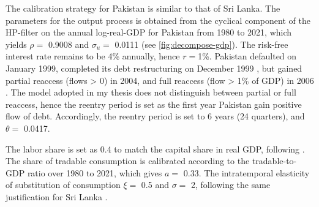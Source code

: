 The calibration strategy for Pakistan is similar to that of Sri Lanka.
The parameters for the output process is obtained from the cyclical component of the HP-filter on the annual log-real-GDP for Pakistan from 1980 to 2021, which yields $\rho = $ 0.9008 and $\sigma_u=$ 0.0111 (see \autoref{fig:decompose-gdp}).
The risk-free interest rate remains to be 4\% annually, hence $r= $1\%.
Pakistan defaulted on January 1999, completed its debt restructuring on December 1999 \citep{SPGlobal-default-report}, but gained partial reaccess (flows > 0) in 2004, and full reaccess (flow > 1\% of GDP) in 2006 \citep*[][Table 5.6]{trebesch-2011-sovereign}.
The model adopted in my thesis does not distinguish between partial or full reaccess, hence the reentry period is set as the first year Pakistan gain positive flow of debt. Accordingly, the reentry period is set to 6 years (24 quarters), and $\theta=$ 0.0417.

The labor share is set as 0.4 to match the capital share in real GDP, following \citet{Pakistan-DSGE-calibration}. The share of tradable consumption is calibrated according to the tradable-to-GDP ratio over 1980 to 2021, which gives $a=$ 0.33. The intratemporal elasticity of substitution of consumption $\xi=$ 0.5 and $\sigma=$ 2, following the same justification for Sri Lanka \citep{Pakistan-DSGE-calibration,Uribe-Schmitt-Grohe-textbook}.


